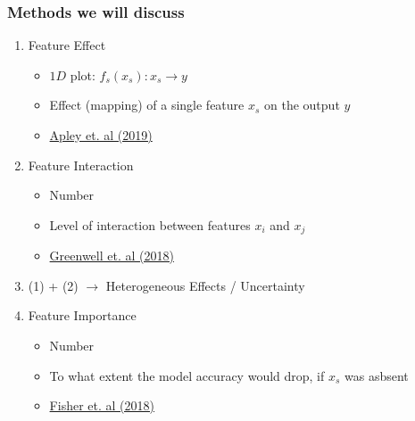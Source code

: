 \begin{frame}
  \frametitle{Methods we will discuss}

  \begin{enumerate}
  \item Feature Effect
    \begin{itemize}
      \item $1D$ plot: \(f_s(x_s): x_s \rightarrow y\)
      \item Effect (mapping) of a single feature \(x_s\) on the output \(y\)
      \item \href{https://arxiv.org/abs/1612.08468}{Apley et. al (2019)}
    \end{itemize}
  \item Feature Interaction
    \begin{itemize}
    \item Number
    \item Level of interaction between features \(x_i\) and \(x_j\)
    \item \href{https://arxiv.org/abs/1805.04755}{Greenwell et. al (2018)}
    \end{itemize}
  \item (1) + (2) $\rightarrow$ Heterogeneous Effects / Uncertainty
  \item Feature Importance
    \begin{itemize}
      \item Number
      \item To what extent the model accuracy would drop, if \(x_s\) was asbsent
        \item \href{https://arxiv.org/abs/1801.01489}{Fisher et. al (2018)}
    \end{itemize}

  \end{enumerate}

\end{frame}
